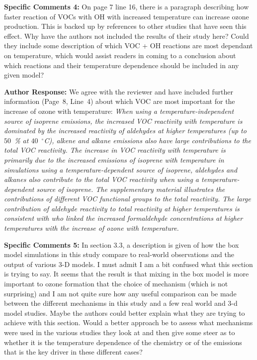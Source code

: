 \documentclass{article}
\DeclareRobustCommand*\degree{\ensuremath{^{\circ}}}
\begin{document}
\textbf{Specific Comments 4:} On page 7 line 16, there is a paragraph describing how faster reaction of VOCs with OH with increased temperature can increase ozone production. This is backed up by references to other studies that have seen this effect. Why have the authors not included the results of their study here? Could they include some description of which VOC + OH reactions are most dependant on temperature, which would assist readers in coming to a conclusion about which reactions and their temperature dependence should be included in any given model?

\textbf{Author Response:} We agree with the reviewer and have included further information (Page~8, Line~4) about which VOC are most important for the increase of ozone with temperature:
\textit{
When using a temperature-independent source of isoprene emissions, the increased VOC reactivity with temperature is dominated by the increased reactivity of aldehydes at higher temperatures (up to $50$~\% at $40$~\degree C), alkene and alkane emissions also have large contributions to the total VOC reactivity.
The increase in VOC reactivity with temperature is primarily due to the increased emissions of isoprene with temperature in simulations using a temperature-dependent source of isoprene, aldehydes and alkanes also contribute to the total VOC reactivity when using a temperature-dependent source of isoprene.
The supplementary material illustrates the contributions of different VOC functional groups to the total reactivity.
The large contribution of aldehyde reactivity to total reactivity at higher temperatures is consistent with \citet{Steiner:2006} who linked the increased formaldehyde concentrations at higher temperatures with the increase of ozone with temperature.
}

\textbf{Specific Comments 5:} In section 3.3, a description is given of how the box model simulations in this study compare to real-world observations and the output of various 3-D models. I must admit I am a bit confused what this section is trying to say. It seems that the result is that mixing in the box model is more important to ozone formation that the choice of mechanism (which is not surprising) and I am not quite sure how any useful comparison can be made between the different mechanisms in this study and a few real world and 3-d model studies. Maybe the authors could better explain what they are trying to achieve with this section. Would a better approach be to assess what mechanisms were used in the various studies they look at and then give some steer as to whether it is the temperature dependence of the chemistry or of the emissions that is the key driver in these different cases?
\end{document}
